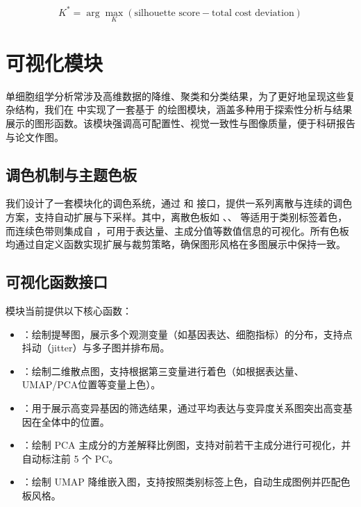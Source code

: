\begin{equation}
K^* = \arg\max_K \left( \text{silhouette score} - \text{total cost deviation} \right)
\end{equation}

\section{可视化模块}

单细胞组学分析常涉及高维数据的降维、聚类和分类结果，为了更好地呈现这些复杂结构，我们在  中实现了一套基于  的绘图模块，涵盖多种用于探索性分析与结果展示的图形函数。该模块强调高可配置性、视觉一致性与图像质量，便于科研报告与论文作图。

\subsection{调色机制与主题色板}

我们设计了一套模块化的调色系统，通过  和  接口，提供一系列离散与连续的调色方案，支持自动扩展与下采样。其中，离散色板如 、、 等适用于类别标签着色，而连续色带则集成自 ，可用于表达量、主成分值等数值信息的可视化。所有色板均通过自定义函数实现扩展与裁剪策略，确保图形风格在多图展示中保持一致。

\subsection{可视化函数接口}

模块当前提供以下核心函数：

\begin{itemize} \item {}：绘制提琴图，展示多个观测变量（如基因表达、细胞指标）的分布，支持点抖动（jitter）与多子图并排布局。 \item {}：绘制二维散点图，支持根据第三变量进行着色（如根据表达量、UMAP/PCA位置等变量上色）。 \item {}：用于展示高变异基因的筛选结果，通过平均表达与变异度关系图突出高变基因在全体中的位置。 \item {}：绘制 PCA 主成分的方差解释比例图，支持对前若干主成分进行可视化，并自动标注前 5 个 PC。 \item {}：绘制 UMAP 降维嵌入图，支持按照类别标签上色，自动生成图例并匹配色板风格。 \end{itemize}


